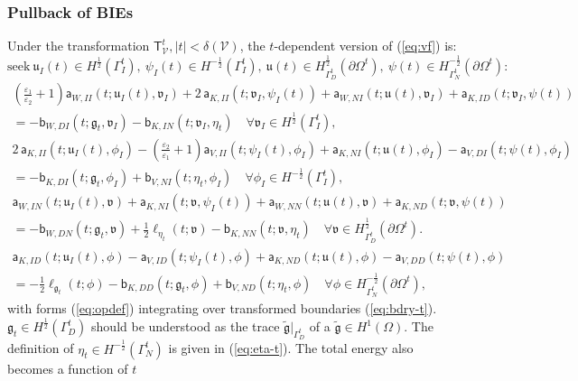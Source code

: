 \documentclass{article}
\theoremstyle{remark}
\newcommand{\T}{\mathsf{T}}
\newcommand{\aaa}{\mathsf{a}}
\newcommand{\bbb}{\mathsf{b}}
\newcommand{\argu}{\mathfrak{u}}
\newcommand{\argv}{\mathfrak{v}}
\newcommand{\argg}{\mathfrak{g}}
\newcommand{\Nu}{\mathcal{V}}
\newcommand{\Tt}{\T_\Nu^t}
\begin{document}
\subsubsection{Pullback of BIEs}
Under the transformation $\Tt, |t|<\delta(\Nu)$, the $t$-dependent version of (\ref{eq:vf}) is:
\begin{equation*}
    \text{seek}~\argu_I(t)\in H^{\frac{1}{2}}(\Gamma_I^t),
    ~\psi_I(t)\in H^{-\frac{1}{2}}(\Gamma_I^t),
    ~\argu(t)\in H^{\frac{1}{2}}_{\Gamma_D^t}(\partial\Omega^t),
    ~\psi(t)\in H^{-\frac{1}{2}}_{\Gamma_N^t}(\partial\Omega^t):
\end{equation*}
\begin{multline*}
    \left(\frac{\varepsilon_1}{\varepsilon_2}+1\right)\aaa_{W,II}(t;\argu_I(t),\argv_I)+2\,\aaa_{K,II}(t;\argv_I,\psi_I(t))+\aaa_{W,NI}(t;\argu(t),\argv_I)+\aaa_{K,ID}(t;\argv_I,\psi(t))\\
    =-\bbb_{W,DI}(t;\argg_t,\argv_I)-\bbb_{K,IN}(t;\argv_I,\eta_t)\quad
    \forall\argv_I\in H^{\frac{1}{2}}(\Gamma_I^t),
\end{multline*}
\begin{multline*}
    2\,\aaa_{K,II}(t;\argu_I(t),\phi_I)-\left(\frac{\varepsilon_2}{\varepsilon_1}+1\right)\aaa_{V,II}(t;\psi_I(t),\phi_I)+\aaa_{K,NI}(t;\argu(t),\phi_I)-\aaa_{V,DI}(t;\psi(t),\phi_I)\\
    =-\bbb_{K,DI}(t;\argg_t,\phi_I)+\bbb_{V,NI}(t;\eta_t,\phi_I)\quad
    \forall\phi_I\in H^{-\frac{1}{2}}(\Gamma_I^t),
\end{multline*}
\begin{multline*}
    \aaa_{W,IN}(t;\argu_I(t),\argv)+\aaa_{K,NI}(t;\argv,\psi_I(t))+\aaa_{W,NN}(t;\argu(t),\argv)+\aaa_{K,ND}(t;\argv,\psi(t))\\
    =-\bbb_{W,DN}(t;\argg_t,\argv)+\frac{1}{2}\ell_{\eta_t}(t;\argv)-\bbb_{K,NN}(t;\argv,\eta_t)\quad
    \forall\argv\in H^{\frac{1}{2}}_{\Gamma_D^t}(\partial\Omega^t).
\end{multline*}
\begin{multline}
\label{eq:vf-t}
    \aaa_{K,ID}(t;\argu_I(t),\phi)-\aaa_{V,ID}(t;\psi_I(t),\phi)+\aaa_{K,ND}(t;\argu(t),\phi)-\aaa_{V,DD}(t;\psi(t),\phi)\\
    =-\frac{1}{2}\ell_{\argg_t}(t;\phi)-\bbb_{K,DD}(t;\argg_t,\phi)+\bbb_{V,ND}(t;\eta_t,\phi)\quad
    \forall\phi\in H^{-\frac{1}{2}}_{\Gamma_N^t}(\partial\Omega^t),
\end{multline}
with forms (\ref{eq:opdef}) integrating over transformed boundaries (\ref{eq:bdry-t}). $\argg_t\in H^{\frac{1}{2}}(\Gamma_D^t)$ should be understood as the trace $\widetilde{\argg}|_{\Gamma_D^t}$ of a $\widetilde{\argg}\in H^1(\Omega)$. The definition of $\eta_t\in H^{-\frac{1}{2}}(\Gamma_N^t)$ is given in (\ref{eq:eta-t}). The total energy also becomes a function of $t$
\end{document}
